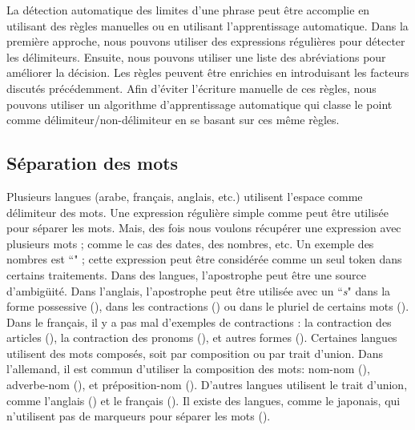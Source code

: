 \documentclass{KodeBook}
\begin{document}
La détection automatique des limites d'une phrase peut être accomplie en utilisant des règles manuelles ou en utilisant l'apprentissage automatique. 
Dans la première approche, nous pouvons utiliser des expressions régulières pour détecter les délimiteurs. 
Ensuite, nous pouvons utiliser une liste des abréviations pour améliorer la décision. 
Les règles peuvent être enrichies en introduisant les facteurs discutés précédemment. 
Afin d'éviter l'écriture manuelle de ces règles, nous pouvons utiliser un algorithme d'apprentissage automatique qui classe le point comme délimiteur/non-délimiteur en se basant sur ces même règles.


\subsection{Séparation des mots}

Plusieurs langues (arabe, français, anglais, etc.) utilisent l'espace comme délimiteur des mots.
Une expression régulière simple comme \expword{/[ ]+/} peut être utilisée pour séparer les mots. 
Mais, des fois nous voulons récupérer une expression avec plusieurs mots ; comme le cas des dates, des nombres, etc. 
Un exemple des nombres est ``" ; cette expression peut être considérée comme un seul token dans certains traitements.
Dans des langues, l'apostrophe peut être une source d'ambigüité. 
Dans l'anglais, l'apostrophe peut être utilisée avec un ``\textit{s}" dans la forme possessive (), dans les contractions () ou dans le pluriel de certains mots (). 
Dans le français, il y a pas mal d'exemples de contractions : la contraction des articles (), la contraction des pronoms (), et autres formes ().
Certaines langues utilisent des mots composés, soit par composition ou par trait d'union. 
Dans l'allemand, il est commun d'utiliser la composition des mots: nom-nom (), adverbe-nom (), et préposition-nom (). 
D'autres langues utilisent le trait d'union, comme l'anglais () et le français (). 
Il existe des langues, comme le japonais, qui n'utilisent pas de marqueurs pour séparer les mots ().
\end{document}
